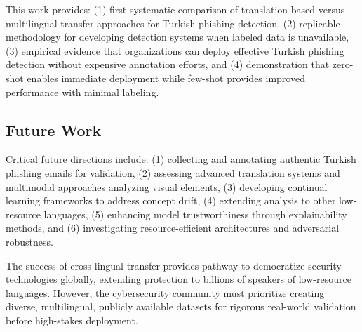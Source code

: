 \documentclass[conference]{IEEEtran}
\begin{document}
This work provides: (1) first systematic comparison of translation-based versus multilingual transfer approaches for Turkish phishing detection, (2) replicable methodology for developing detection systems when labeled data is unavailable, (3) empirical evidence that organizations can deploy effective Turkish phishing detection without expensive annotation efforts, and (4) demonstration that zero-shot enables immediate deployment while few-shot provides improved performance with minimal labeling.

\subsection{Future Work}

Critical future directions include: (1) collecting and annotating authentic Turkish phishing emails for validation, (2) assessing advanced translation systems and multimodal approaches analyzing visual elements, (3) developing continual learning frameworks to address concept drift, (4) extending analysis to other low-resource languages, (5) enhancing model trustworthiness through explainability methods, and (6) investigating resource-efficient architectures and adversarial robustness.

The success of cross-lingual transfer provides pathway to democratize security technologies globally, extending protection to billions of speakers of low-resource languages. However, the cybersecurity community must prioritize creating diverse, multilingual, publicly available datasets for rigorous real-world validation before high-stakes deployment.
\end{document}
